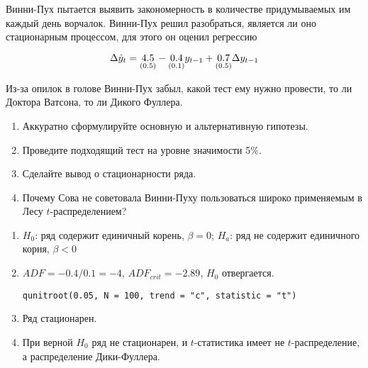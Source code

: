 \begin{problem}
Винни-Пух пытается выявить закономерность в количестве придумываемых им каждый день ворчалок.  Винни-Пух решил разобраться, является ли оно стационарным процессом, для этого он оценил регрессию

\[ 
  \Delta \hat{y}_t = \underset{(0.5)}{4.5} - \underset{(0.1)}{0.4}y_{t-1} +\underset{(0.5)}{0.7} \Delta y_{t-1} 
\]

Из-за опилок в голове Винни-Пух забыл, какой тест ему нужно провести, то ли Доктора Ватсона, то ли Дикого Фуллера.

\begin{enumerate}
\item Аккуратно сформулируйте основную и альтернативную гипотезы.
\item Проведите подходящий тест на уровне значимости 5\%.
\item Сделайте вывод о стационарности ряда.
\item Почему Сова не советовала Винни-Пуху пользоваться широко применяемым в Лесу $t$-распределением?
\end{enumerate}


\begin{sol}

\begin{enumerate}
\item $H_0$: ряд содержит единичный корень, $\beta=0$; $H_a$: ряд не содержит единичного корня, $\beta<0$
\item $ADF=-0.4/0.1=-4$, $ADF_{crit}=-2.89$, $H_0$ отвергается.

\begin{verbatim}
qunitroot(0.05, N = 100, trend = "c", statistic = "t")
\end{verbatim}

\item Ряд стационарен.
\item При верной $H_0$ ряд не стационарен, и  $t$-статистика имеет не $t$-распределение, а распределение Дики-Фуллера.
\end{enumerate}
\end{sol}
\end{problem}




